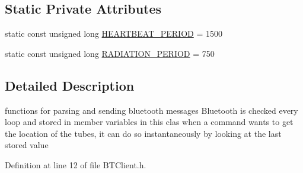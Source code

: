 \subsection*{Static Private Attributes}
\begin{DoxyCompactItemize}
\item 
static const unsigned long \hyperlink{classBTClient_a83a636a5a8d0bd9c61d7a1e5566e3cfd}{H\-E\-A\-R\-T\-B\-E\-A\-T\-\_\-\-P\-E\-R\-I\-O\-D} = 1500
\item 
static const unsigned long \hyperlink{classBTClient_af104d8cffa9b3360c2b28acf07acc03a}{R\-A\-D\-I\-A\-T\-I\-O\-N\-\_\-\-P\-E\-R\-I\-O\-D} = 750
\end{DoxyCompactItemize}


\subsection{Detailed Description}
functions for parsing and sending bluetooth messages Bluetooth is checked every loop and stored in member variables in this clas when a command wants to get the location of the tubes, it can do so instantaneously by looking at the last stored value 

Definition at line 12 of file B\-T\-Client.\-h.



